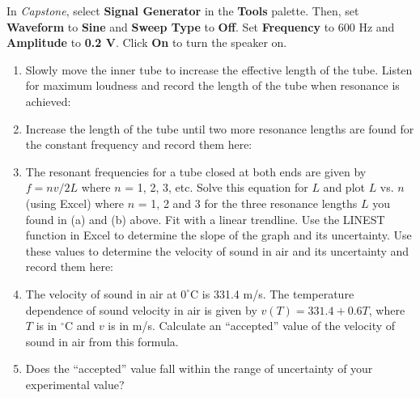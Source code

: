 \item In \textit{Capstone}, select \textbf{Signal Generator} in the \textbf{Tools} palette. Then, set \textbf{Waveform} to \textbf{Sine} and \textbf{Sweep Type} to \textbf{Off}. Set \textbf{Frequency} to 600 Hz and \textbf{Amplitude} to \textbf{0.2 V}. Click \textbf{On} to turn the speaker on.

\begin{enumerate}[labparts]
\item Slowly move the inner tube to increase the effective length of the tube. Listen for maximum loudness and record the length of the tube when resonance is achieved:
\vspace{10mm}

\item Increase the length of the tube until two more resonance lengths are found for the constant frequency and record them here:
\vspace{10mm}


\item The resonant frequencies for a tube closed at both ends are given by 
$f=nv/2L$ where $n$ = 1, 2, 3, etc. Solve this equation for $L$ and plot $L$ 
vs. $n$ (using Excel) where $n$ = 1, 2 and 3 for the three resonance lengths $L$
you found in (a) and (b) above. Fit with a linear trendline. Use the LINEST function in Excel to determine the slope of the graph and its uncertainty. Use these values to determine the velocity of sound in air and its uncertainty and record them here:
\vspace{20mm}

\item The velocity of sound in air at $0^\circ$C is 331.4 m/s.  The temperature dependence of sound velocity in air is given by $v(T) = 331.4 + 0.6T$, where $T$ is in $^\circ$C and $v$ is in m/s. Calculate an ``accepted'' value of the velocity of sound in air from this formula.
\vspace{20mm}

\item Does the ``accepted'' value fall within the range of uncertainty of your experimental value?
\answerspace{5mm}
\end{enumerate}
